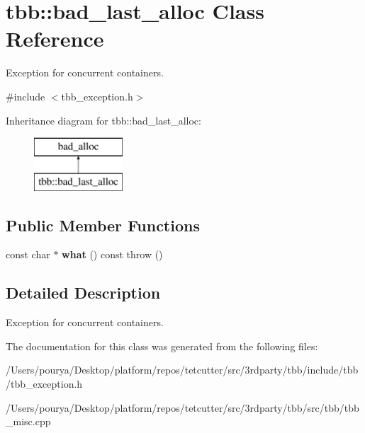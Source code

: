 \hypertarget{classtbb_1_1bad__last__alloc}{}\section{tbb\+:\+:bad\+\_\+last\+\_\+alloc Class Reference}
\label{classtbb_1_1bad__last__alloc}


Exception for concurrent containers.  




{\ttfamily \#include $<$tbb\+\_\+exception.\+h$>$}

Inheritance diagram for tbb\+:\+:bad\+\_\+last\+\_\+alloc\+:\begin{figure}[H]
\begin{center}
\leavevmode
\includegraphics[height=2.000000cm]{classtbb_1_1bad__last__alloc}
\end{center}
\end{figure}
\subsection*{Public Member Functions}
\begin{DoxyCompactItemize}
\item 
\hypertarget{classtbb_1_1bad__last__alloc_a54491310d20cbb8eae14b51464279614}{}const char $\ast$ {\bfseries what} () const   throw ()\label{classtbb_1_1bad__last__alloc_a54491310d20cbb8eae14b51464279614}

\end{DoxyCompactItemize}


\subsection{Detailed Description}
Exception for concurrent containers. 

The documentation for this class was generated from the following files\+:\begin{DoxyCompactItemize}
\item 
/\+Users/pourya/\+Desktop/platform/repos/tetcutter/src/3rdparty/tbb/include/tbb/tbb\+\_\+exception.\+h\item 
/\+Users/pourya/\+Desktop/platform/repos/tetcutter/src/3rdparty/tbb/src/tbb/tbb\+\_\+misc.\+cpp\end{DoxyCompactItemize}
